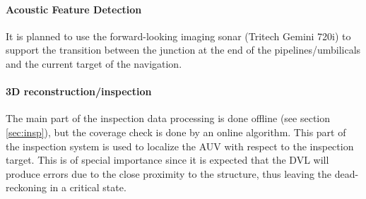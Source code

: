 \documentclass[conference]{IEEEtran}
\begin{document}
\paragraph*{\textbf{Acoustic Feature Detection}} It is planned to use the forward-looking 
imaging sonar (Tritech Gemini 720i) to support the transition between the junction at the end of the 
pipelines/umbilicals and the current target of the navigation.
\paragraph*{\textbf{3D reconstruction/inspection}} The main part of the inspection data 
processing is done offline (see section \ref{sec:insp}), but the coverage check is done by an 
online algorithm. This part of the inspection system is used to localize the AUV with respect 
to the inspection target. This is of special importance since it is expected that the DVL 
will produce errors due to the close proximity to the structure, thus leaving the 
dead-reckoning in a critical state.
\end{document}
